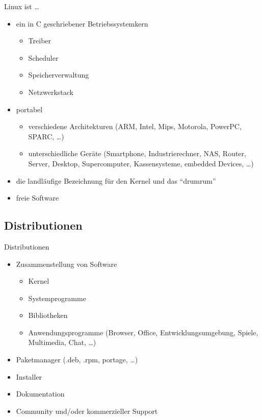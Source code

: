 \documentclass{beamer}
\begin{document}
\begin{frame}{Linux ist …}
    \begin{itemize}
        \item ein in C geschriebener Betriebssystemkern
            \begin{itemize}
                \item Treiber
                \item Scheduler
                \item Speicherverwaltung
                \item Netzwerkstack
            \end{itemize}
        \pause
        \item portabel
            \begin{itemize}
                \item verschiedene Architekturen (ARM, Intel, Mips,
                    Motorola, PowerPC, SPARC, …)
                \item unterschiedliche Geräte (Smartphone,
                    Industrierechner, NAS, Router, Server, Desktop,
                    Supercomputer, Kassensysteme, embedded Devices, …)
            \end{itemize}
        \pause
        \item die landläufige Bezeichnung für den Kernel und das \enquote{drumrum}
        \pause
        \item freie Software
    \end{itemize}
\end{frame}

\subsection{Distributionen}

\begin{frame}{Distributionen}
    \begin{itemize}
        \item Zusammenstellung von Software
            \begin{itemize}
                \item Kernel
                \item Systemprogramme
                \item Bibliotheken
                \item Anwendungsprogramme (Browser, Office, 
                    Entwicklungsumgebung, Spiele, Multimedia, Chat, …)
            \end{itemize}
        \pause
        \item Paketmanager (.deb, .rpm, portage, …)
        \pause
        \item Installer
        \item Dokumentation
        \item Community und/oder kommerzieller Support
    \end{itemize}
\end{frame}
\end{document}
